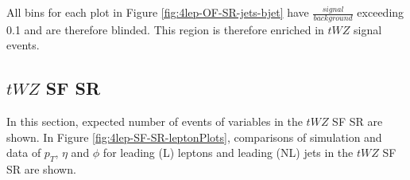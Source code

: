 All bins for each plot in Figure \ref{fig:4lep-OF-SR-jets-bjet} have $\frac{signal}{background}$ exceeding 0.1 and are therefore blinded. This region is therefore enriched in $tWZ$ signal events.


\subsection{$tWZ$ SF SR}
\label{sec:controlplotstetralepton-tWZ-SF-SR}


In this section, expected number of events of variables in the $tWZ$ SF SR are shown. In Figure \ref{fig:4lep-SF-SR-leptonPlots}, comparisons of simulation and data of $p_{T}$, $\eta$ and $\phi$ for leading (L) leptons and leading (NL) jets in the $tWZ$ SF SR are shown.


